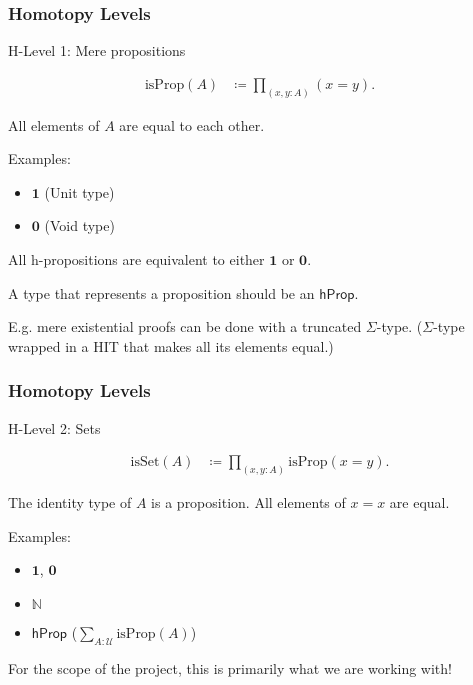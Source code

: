 \documentclass[9pt]{beamer}
\begin{document}
\begin{frame}
\frametitle{Homotopy Levels}

H-Level 1: Mere propositions

\begin{align*}
  \text{isProp}(A) & \coloneqq \prod_{(x,y:A)} (x = y).
\end{align*}

All elements of $A$ are equal to each other.

Examples:
\begin{itemize}
  \item $\mathbf{1}$ (Unit type)
  \item $\mathbf{0}$ (Void type)
\end{itemize}

All h-propositions are equivalent to either $\mathbf{1}$ or $\mathbf{0}$.

A type that represents a proposition should be an $\mathsf{hProp}$.

E.g. mere existential proofs can be done with a truncated $\Sigma$-type.
($\Sigma$-type wrapped in a HIT that makes all its elements equal.)

\end{frame}

\begin{frame}
\frametitle{Homotopy Levels}

H-Level 2: Sets

\begin{align*}
  \text{isSet}(A) & \coloneqq \prod_{(x,y:A)} \text{isProp}(x = y).
\end{align*}

The identity type of $A$ is a proposition.
All elements of $x = x$ are equal.

Examples:
\begin{itemize}
  \item $\mathbf{1}$, $\mathbf{0}$
  \item $\mathbb{N}$
  \item $\mathsf{hProp}$ ($\sum_{A : \mathcal{U}} \text{isProp}(A)$)
\end{itemize}

For the scope of the project, this is primarily what we are working with!

\end{frame}
\end{document}
